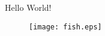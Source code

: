 \documentclass[12pt]{article}
\begin{document}
Hello World!
\begin{figure}
   \texttt{[image: fish.eps]}
\end{figure}
\end{document}

